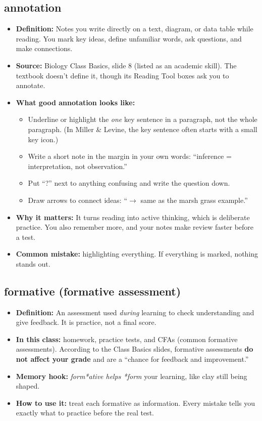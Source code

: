 \documentclass[11pt,letterpaper]{article}
\begin{document}
\subsection{annotation}
\begin{itemize}
  \item \textbf{Definition:} Notes you write directly on a text, diagram, or data table while reading. You mark key ideas, define unfamiliar words, ask questions, and make connections.
  \item \textbf{Source:} Biology Class Basics, slide 8 (listed as an academic skill). The textbook doesn't define it, though its Reading Tool boxes ask you to annotate.
  \item \textbf{What good annotation looks like:}
  \begin{itemize}
    \item Underline or highlight the \emph{one} key sentence in a paragraph, not the whole paragraph. (In Miller \& Levine, the key sentence often starts with a small key icon.)
    \item Write a short note in the margin in your own words: ``inference = interpretation, not observation.''
    \item Put ``?'' next to anything confusing and write the question down.
    \item Draw arrows to connect ideas: ``$\rightarrow$ same as the marsh grass example.''
  \end{itemize}
  \item \textbf{Why it matters:} It turns reading into active thinking, which is deliberate practice. You also remember more, and your notes make review faster before a test.
  \item \textbf{Common mistake:} highlighting everything. If everything is marked, nothing stands out.
\end{itemize}


\subsection{formative (formative assessment)}
\begin{itemize}
  \item \textbf{Definition:} An assessment used \emph{during} learning to check understanding and give feedback. It is practice, not a final score.
  \item \textbf{In this class:} homework, practice tests, and CFAs (common formative assessments). According to the Class Basics slides, formative assessments \textbf{do not affect your grade} and are a ``chance for feedback and improvement.''
  \item \textbf{Memory hook:} \emph{form*ative helps *form} your learning, like clay still being shaped.
  \item \textbf{How to use it:} treat each formative as information. Every mistake tells you exactly what to practice before the real test.
\end{itemize}
\end{document}
